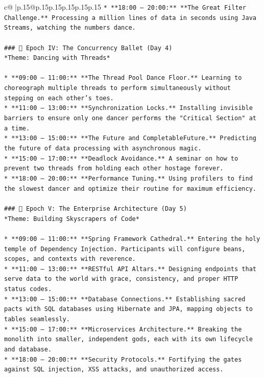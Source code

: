 \documentclass{article}
\begin{document}
{\begin{supertabular}{c@{$\;$}|p{.15\linewidth}@{}p{.15\linewidth}p{.15\linewidth}p{.15\linewidth}p{.15\linewidth}p{.15\linewidth}}
{{{\texttt{*   **18:00 – 20:00:** **The Great Filter Challenge.** Processing a million lines of data in seconds using Java Streams, watching the numbers dance.} \\
\\ 
\texttt{\#\#\# 📅 Epoch IV: The Concurrency Ballet (Day 4)} \\
\texttt{*Theme: Dancing with Threads*} \\
\\ 
\texttt{*   **09:00 – 11:00:** **The Thread Pool Dance Floor.** Learning to choreograph multiple threads to perform simultaneously without stepping on each other's toes.} \\
\texttt{*   **11:00 – 13:00:** **Synchronization Locks.** Installing invisible barriers to ensure only one dancer performs the "Critical Section" at a time.} \\
\texttt{*   **13:00 – 15:00:** **The Future and CompletableFuture.** Predicting the future of data processing with asynchronous magic.} \\
\texttt{*   **15:00 – 17:00:** **Deadlock Avoidance.** A seminar on how to prevent two threads from holding each other hostage forever.} \\
\texttt{*   **18:00 – 20:00:** **Performance Tuning.** Using profilers to find the slowest dancer and optimize their routine for maximum efficiency.} \\
\\ 
\texttt{\#\#\# 📅 Epoch V: The Enterprise Architecture (Day 5)} \\
\texttt{*Theme: Building Skyscrapers of Code*} \\
\\ 
\texttt{*   **09:00 – 11:00:** **Spring Framework Cathedral.** Entering the holy temple of Dependency Injection. Participants will configure beans, scopes, and contexts with reverence.} \\
\texttt{*   **11:00 – 13:00:** **RESTful API Altars.** Designing endpoints that serve data to the world with grace, consistency, and proper HTTP status codes.} \\
\texttt{*   **13:00 – 15:00:** **Database Connections.** Establishing sacred pacts with SQL databases using Hibernate and JPA, mapping objects to tables seamlessly.} \\
\texttt{*   **15:00 – 17:00:** **Microservices Architecture.** Breaking the monolith into smaller, independent gods, each with its own lifecycle and database.} \\
\texttt{*   **18:00 – 20:00:** **Security Protocols.** Fortifying the gates against SQL injection, XSS attacks, and unauthorized access.} \\
}}}
\end{supertabular}}
\end{document}
